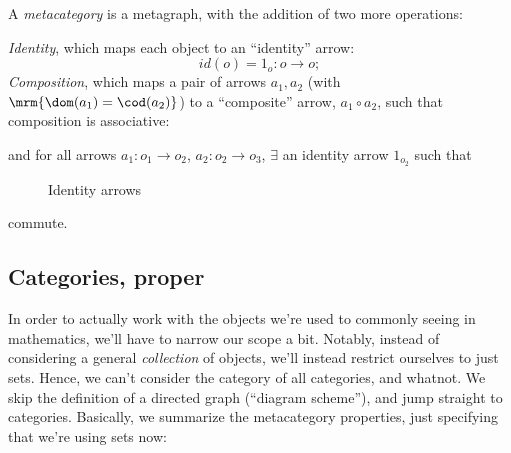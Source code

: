 \documentclass{fkbook}
\theoremstyle{snazzydefinition}
\begin{document}
\begin{definition}[Metacategory]
  A \emph{metacategory} is a metagraph, with the addition of two more
  operations:

  \emph{Identity}, which maps each object to an ``identity'' arrow:
  \[
    id(o) = 1_o : o \to o;
  \]
  \emph{Composition}, which maps a pair of arrows $a_1, a_2$ (with
  $\mrm{\dom(a_1) = \cod(a_2)}$) to a ``composite'' arrow, $a_1 \circ
  a_2$, such that composition is associative:
  \begin{figure}[H]
    \centering
  \end{figure}
  and for all arrows $a_1
  : o_1 \to o_2$, $a_2 : o_2 \to o_3$, $\exists$ an identity arrow
  $1_{o_2}$ such that
  \begin{figure}[H]
    \centering
    \begin{minipage}{.49\linewidth}
      \centering
    \end{minipage}
    \begin{minipage}{.49\linewidth}
      \centering
    \end{minipage}
    \caption{Identity arrows}
  \end{figure}
  commute.
\end{definition}

\subsection{Categories, proper}
In order to actually work with the objects we're used to commonly
seeing in mathematics, we'll have to narrow our scope a bit. Notably,
instead of considering a general \emph{collection} of objects, we'll
instead restrict ourselves to just sets. Hence, we can't consider the
category of all categories, and whatnot. We skip the definition of a
directed graph (``diagram scheme''), and jump straight to categories.
Basically, we summarize the metacategory properties, just specifying
that we're using sets now:
\end{document}
